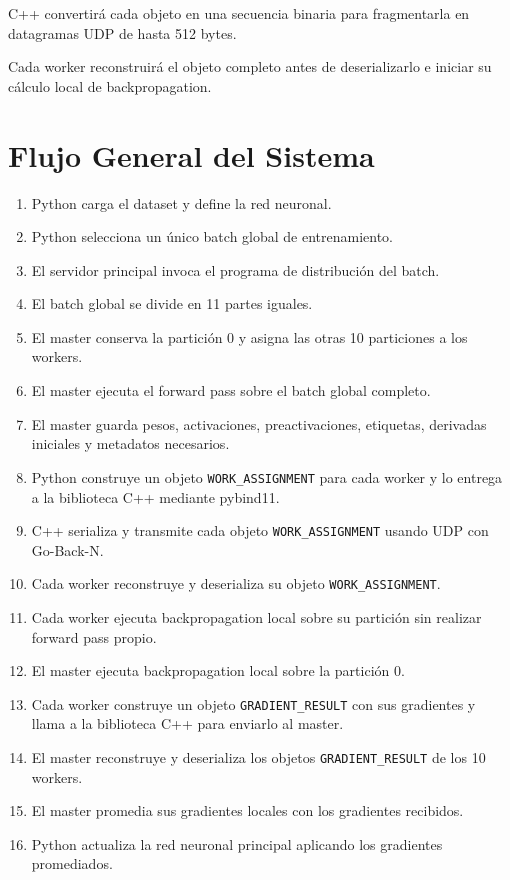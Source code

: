 \documentclass[12pt]{article}
\begin{document}
C++ convertirá cada objeto en una secuencia binaria para fragmentarla en datagramas UDP de hasta 512 bytes.

Cada worker reconstruirá el objeto completo antes de deserializarlo e iniciar su cálculo local de backpropagation.

\section{Flujo General del Sistema}

\begin{enumerate}

\item Python carga el dataset y define la red neuronal.
\item Python selecciona un único batch global de entrenamiento.
\item El servidor principal invoca el programa de distribución del batch.
\item El batch global se divide en 11 partes iguales.
\item El master conserva la partición 0 y asigna las otras 10 particiones a los workers.
\item El master ejecuta el forward pass sobre el batch global completo.
\item El master guarda pesos, activaciones, preactivaciones, etiquetas, derivadas iniciales y metadatos necesarios.
\item Python construye un objeto \texttt{WORK\_ASSIGNMENT} para cada worker y lo entrega a la biblioteca C++ mediante pybind11.
\item C++ serializa y transmite cada objeto \texttt{WORK\_ASSIGNMENT} usando UDP con Go-Back-N.
\item Cada worker reconstruye y deserializa su objeto \texttt{WORK\_ASSIGNMENT}.
\item Cada worker ejecuta backpropagation local sobre su partición sin realizar forward pass propio.
\item El master ejecuta backpropagation local sobre la partición 0.
\item Cada worker construye un objeto \texttt{GRADIENT\_RESULT} con sus gradientes y llama a la biblioteca C++ para enviarlo al master.
\item El master reconstruye y deserializa los objetos \texttt{GRADIENT\_RESULT} de los 10 workers.
\item El master promedia sus gradientes locales con los gradientes recibidos.
\item Python actualiza la red neuronal principal aplicando los gradientes promediados.

\end{enumerate}
\end{document}

